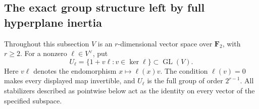 \subsection{The exact group structure left by full hyperplane inertia}
\label{subsec:full-radical-image-structure}

Throughout this subsection \(V\) is an \(r\)-dimensional vector space
over \(\mathbf F_2\), with \(r\geq2\). For a nonzero
\(\ell\in V^\vee\), put
\[
 U_\ell=\{1+v\ell:v\in\ker\ell\}\subset\operatorname{GL}(V).
 \tag{FR1}
\]
Here \(v\ell\) denotes the endomorphism \(x\mapsto\ell(x)v\).
The condition \(\ell(v)=0\) makes every displayed map invertible,
and \(U_\ell\) is the full group of order \(2^{r-1}\).
All stabilizers described as pointwise below act as the identity on
every vector of the specified subspace.

